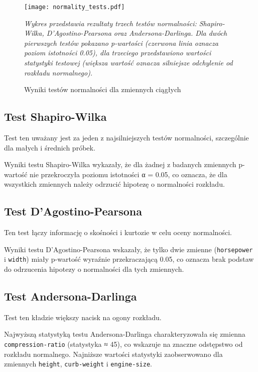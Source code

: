 \documentclass[12pt,a4paper]{article}
\begin{document}
\begin{figure}[H]
    \centering
    \texttt{[image: normality\_tests.pdf]}
    \caption{Wyniki testów normalności dla zmiennych ciągłych}
    \label{fig:normality_tests}
    \small\textit{Wykres przedstawia rezultaty trzech testów normalności: Shapiro-Wilka, D'Agostino-Pearsona oraz Andersona-Darlinga. Dla dwóch pierwszych testów pokazano p-wartości (czerwona linia oznacza poziom istotności 0.05), dla trzeciego przedstawiono wartości statystyki testowej (większa wartość oznacza silniejsze odchylenie od rozkładu normalnego).}
\end{figure}

\subsection{Test Shapiro-Wilka}

Test ten uważany jest za jeden z najsilniejszych testów normalności, szczególnie dla małych i średnich próbek.

Wyniki testu Shapiro-Wilka wykazały, że dla żadnej z badanych zmiennych p-wartość nie przekroczyła poziomu istotności α = 0.05, co oznacza, że dla wszystkich zmiennych należy odrzucić hipotezę o normalności rozkładu.

\subsection{Test D'Agostino-Pearsona}

Ten test łączy informację o skośności i kurtozie w celu oceny normalności.

Wyniki testu D'Agostino-Pearsona wskazały, że tylko dwie zmienne (\texttt{horsepower} i \texttt{width}) miały p-wartość wyraźnie przekraczającą 0.05, co oznacza brak podstaw do odrzucenia hipotezy o normalności dla tych zmiennych.

\subsection{Test Andersona-Darlinga}

Test ten kładzie większy nacisk na ogony rozkładu.

Najwyższą statystyką testu Andersona-Darlinga charakteryzowała się zmienna \texttt{compression-ratio} (statystyka ≈ 45), co wskazuje na znaczne odstępstwo od rozkładu normalnego. Najniższe wartości statystyki zaobserwowano dla zmiennych \texttt{height}, \texttt{curb-weight} i \texttt{engine-size}.
\end{document}
